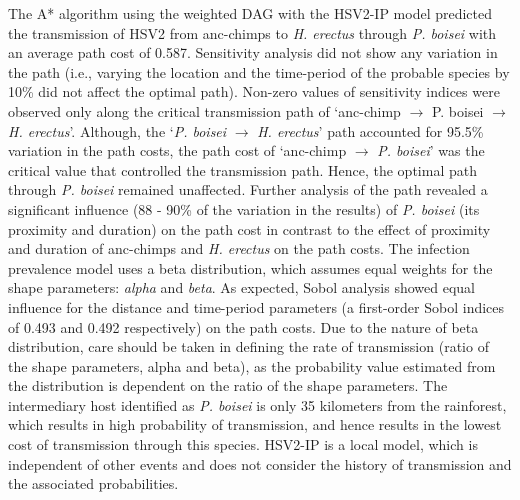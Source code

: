 \documentclass[fleqn,10pt]{wlscirep}
\begin{document}
The A* algorithm using the weighted DAG with the HSV2-IP model predicted the transmission of HSV2 from anc-chimps to \textit{H. erectus} through \textit{P. boisei} with an average path cost of 0.587. Sensitivity analysis did not show any variation in the path (i.e., varying the location and the time-period of the probable species by 10\% did not affect the optimal path). Non-zero values of sensitivity indices were observed only along the critical transmission path of `anc-chimp $\rightarrow$ P. boisei $\rightarrow$ \textit{H. erectus}'. Although, the `\textit{P. boisei} $\rightarrow$ \textit{H. erectus}' path accounted for 95.5\% variation in the path costs, the path cost of `anc-chimp $\rightarrow$ \textit{P. boisei}' was the critical value that controlled the transmission path. Hence, the optimal path through \textit{P. boisei} remained unaffected. Further analysis of the path revealed a significant influence (88 - 90\% of the variation in the results) of \textit{P. boisei} (its proximity and duration) on the path cost in contrast to the effect of proximity and duration of anc-chimps and \textit{H. erectus} on the path costs. The infection prevalence model uses a beta distribution, which assumes equal weights for the shape parameters: \textit{alpha} and \textit{beta}. As expected, Sobol analysis showed equal influence for the distance and time-period parameters (a first-order Sobol indices of 0.493 and 0.492 respectively) on the path costs. Due to the nature of beta distribution, care should be taken in defining the rate of transmission (ratio of the shape parameters, alpha and beta), as the probability value estimated from the distribution is dependent on the ratio of the shape parameters. The intermediary host identified as \textit{P. boisei} is only 35 kilometers from the rainforest, which results in high probability of transmission, and hence results in the lowest cost of transmission through this species. HSV2-IP is a local model, which is independent of other events and does not consider the history of transmission and the associated probabilities.
\end{document}
